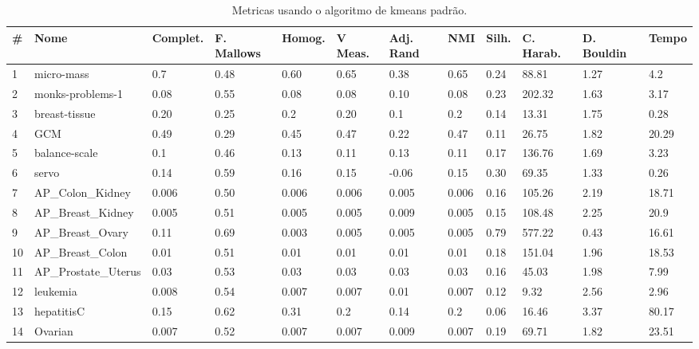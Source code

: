 \documentclass[sn-mathphys,Numbered]{sn-jnl}%
\theoremstyle{thmstyleone}%
\theoremstyle{thmstyletwo}%
\theoremstyle{thmstylethree}%
\begin{document}
\begin{table}[ht]
    \centering
    \footnotesize
    \setlength{\tabcolsep}{4pt}
    \caption{Metricas usando o algoritmo de kmeans padrão.}
    \begin{tabular}{@{}p{0.1cm}p{2.3cm}p{1.3cm}p{1cm}p{1cm}p{0.8cm}p{1cm}p{1cm}p{0.8cm}p{1cm}p{1cm}p{0.8cm}@{}}
        \toprule
        \textbf{\#} & 
        \textbf{Nome} & 
        \textbf{Complet.} & 
        \textbf{F. Mallows} & 
        \textbf{Homog.} & 
        \textbf{V Meas.} & 
        \textbf{Adj. Rand} & 
        \textbf{NMI} & 
        \textbf{Silh.} & 
        \textbf{C. Harab.} & 
        \textbf{D. Bouldin} & 
        \textbf{Tempo} \\
        \midrule
        1 & micro-mass & 0.7 & 0.48 & 0.60 & 0.65 & 0.38 & 0.65 & 0.24 & 88.81 & 1.27 & 4.2\\
        2 & monks-problems-1 & 0.08 & 0.55 & 0.08 & 0.08 & 0.10 & 0.08 & 0.23 & 202.32 & 1.63 & 3.17\\
        3 & breast-tissue & 0.20 & 0.25 & 0.2 & 0.20 & 0.1 & 0.2 & 0.14 & 13.31 & 1.75 & 0.28\\
        4 & GCM & 0.49 & 0.29 & 0.45 & 0.47 & 0.22 & 0.47 & 0.11 & 26.75 & 1.82 & 20.29\\
        5 & balance-scale & 0.1 & 0.46 & 0.13 & 0.11 & 0.13 & 0.11 & 0.17 & 136.76 & 1.69 & 3.23\\
        6 & servo & 0.14 & 0.59 & 0.16 & 0.15 & -0.06 & 0.15 & 0.30 & 69.35 & 1.33 & 0.26\\
        7 & AP\_Colon\_Kidney & 0.006 & 0.50 & 0.006 & 0.006 & 0.005 & 0.006 & 0.16 & 105.26 & 2.19 & 18.71\\
        8 & AP\_Breast\_Kidney & 0.005 & 0.51 & 0.005 & 0.005 & 0.009 & 0.005 & 0.15 & 108.48 & 2.25 & 20.9\\
        9 & AP\_Breast\_Ovary & 0.11 & 0.69 & 0.003 & 0.005 & 0.005 & 0.005 & 0.79 & 577.22 & 0.43 & 16.61\\
        10 & AP\_Breast\_Colon & 0.01 & 0.51 & 0.01 & 0.01 & 0.01 & 0.01 & 0.18 & 151.04 & 1.96 & 18.53\\
        11 & AP\_Prostate\_Uterus & 0.03 & 0.53 & 0.03 & 0.03 & 0.03 & 0.03 & 0.16 & 45.03 & 1.98 & 7.99\\
        12 & leukemia & 0.008 & 0.54 & 0.007 & 0.007 & 0.01 & 0.007 & 0.12 & 9.32 & 2.56 & 2.96\\
        13 & hepatitisC & 0.15 & 0.62 & 0.31 & 0.2 & 0.14 & 0.2 & 0.06 & 16.46 & 3.37 & 80.17\\
        14 & Ovarian & 0.007 & 0.52 & 0.007 & 0.007 & 0.009 & 0.007 & 0.19 & 69.71 & 1.82 & 23.51\\

\end{tabular}
\end{table}
\end{document}
